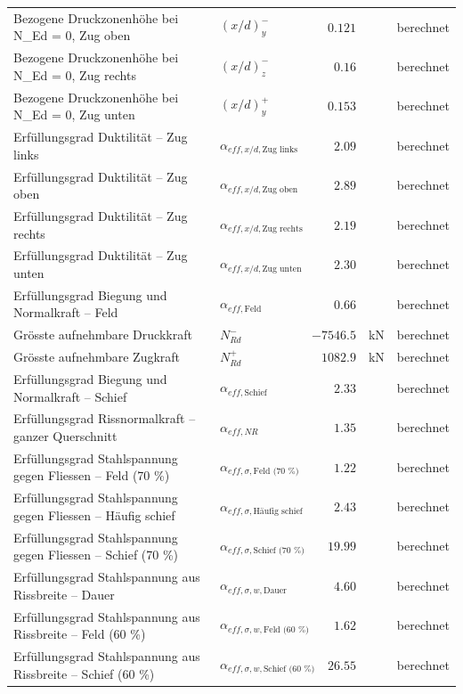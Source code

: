 \documentclass[11pt,a4paper]{article}
\begin{document}
\begin{xltabular}{\linewidth}{>{\raggedright\arraybackslash}Xlrll}
Bezogene Druckzonenhöhe bei N\_Ed = 0, Zug oben & $\left(x/d\right)_{y}^{-}$ & $0.121$ &  & berechnet \\
Bezogene Druckzonenhöhe bei N\_Ed = 0, Zug rechts & $\left(x/d\right)_{z}^{-}$ & $0.16$ &  & berechnet \\
Bezogene Druckzonenhöhe bei N\_Ed = 0, Zug unten & $\left(x/d\right)_{y}^{+}$ & $0.153$ &  & berechnet \\
Erfüllungsgrad Duktilität – Zug links & $\alpha_{eff,x/d,\text{Zug links}}$ & $2.09$ &  & berechnet \\
Erfüllungsgrad Duktilität – Zug oben & $\alpha_{eff,x/d,\text{Zug oben}}$ & $2.89$ &  & berechnet \\
Erfüllungsgrad Duktilität – Zug rechts & $\alpha_{eff,x/d,\text{Zug rechts}}$ & $2.19$ &  & berechnet \\
Erfüllungsgrad Duktilität – Zug unten & $\alpha_{eff,x/d,\text{Zug unten}}$ & $2.30$ &  & berechnet \\
Erfüllungsgrad Biegung und Normalkraft – Feld & $\alpha_{eff,\text{Feld}}$ & $0.66$ &  & berechnet \\
Grösste aufnehmbare Druckkraft & $N_{Rd}^{-}$ & $-7546.5$ & kN & berechnet \\
Grösste aufnehmbare Zugkraft & $N_{Rd}^{+}$ & $1082.9$ & kN & berechnet \\
Erfüllungsgrad Biegung und Normalkraft – Schief & $\alpha_{eff,\text{Schief}}$ & $2.33$ &  & berechnet \\
Erfüllungsgrad Rissnormalkraft – ganzer Querschnitt & $\alpha_{eff,NR}$ & $1.35$ &  & berechnet \\
Erfüllungsgrad Stahlspannung gegen Fliessen – Feld (70 \%) & $\alpha_{eff,\sigma,\text{Feld (70 \%)}}$ & $1.22$ &  & berechnet \\
Erfüllungsgrad Stahlspannung gegen Fliessen – Häufig schief & $\alpha_{eff,\sigma,\text{Häufig schief}}$ & $2.43$ &  & berechnet \\
Erfüllungsgrad Stahlspannung gegen Fliessen – Schief (70 \%) & $\alpha_{eff,\sigma,\text{Schief (70 \%)}}$ & $19.99$ &  & berechnet \\
Erfüllungsgrad Stahlspannung aus Rissbreite – Dauer & $\alpha_{eff,\sigma,w,\text{Dauer}}$ & $4.60$ &  & berechnet \\
Erfüllungsgrad Stahlspannung aus Rissbreite – Feld (60 \%) & $\alpha_{eff,\sigma,w,\text{Feld (60 \%)}}$ & $1.62$ &  & berechnet \\
Erfüllungsgrad Stahlspannung aus Rissbreite – Schief (60 \%) & $\alpha_{eff,\sigma,w,\text{Schief (60 \%)}}$ & $26.55$ &  & berechnet \\

\end{xltabular}
\end{document}
